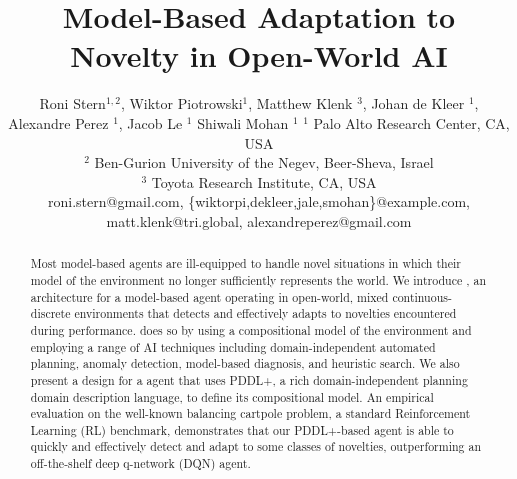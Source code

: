 \documentclass{article}
\title{Model-Based Adaptation to Novelty in Open-World AI}
\author{
Roni Stern$^{1,2}$,
Wiktor Piotrowski$^{1}$,
Matthew Klenk $^{3}$,
Johan de Kleer $^{1}$,
Alexandre Perez $^{1}$,
Jacob Le $^{1}$
Shiwali Mohan $^{1}$
\affiliations
$^1$ Palo Alto Research Center, CA, USA\\
$^2$ Ben-Gurion University of the Negev, Beer-Sheva, Israel\\
$^3$ Toyota Research Institute, CA, USA\\

\emails
\small{
roni.stern@gmail.com,
\{wiktorpi,dekleer,jale,smohan\}@example.com,
matt.klenk@tri.global,
alexandreperez@gmail.com}
}
\begin{document}
\maketitle

\begin{abstract}
Most model-based agents are ill-equipped to handle novel situations in which their model of the environment no longer sufficiently represents the world. 
We introduce \hydra, an architecture for a model-based agent operating in open-world, mixed continuous-discrete environments that detects and effectively adapts to novelties encountered during performance. 
\hydra does so by using a compositional model of the environment and employing a range of AI techniques including domain-independent automated planning, anomaly detection, model-based diagnosis, and heuristic search. We also present a design for a \hydra agent that uses PDDL+, a rich domain-independent planning domain description language, to define its compositional model. 
An empirical evaluation on the well-known balancing cartpole problem, a standard Reinforcement Learning (RL) benchmark, demonstrates that our PDDL+-based \hydra agent is able to quickly and effectively detect and adapt to some classes of novelties, outperforming an off-the-shelf deep q-network (DQN) agent. 

 

\end{abstract}
\end{document}
